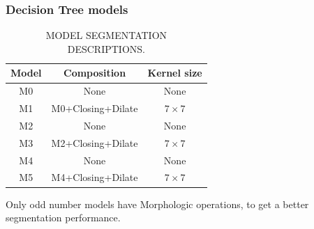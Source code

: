 \documentclass[
serif,
compress,
xcolor=table,
dvipsnames,
]{beamer}
\begin{document}
\begin{frame}
\frametitle{Decision Tree models}
\begin{table}[h]
\caption*{MODEL SEGMENTATION DESCRIPTIONS.}
\centering
    \begin{tabular}{|c|c|c|}
    \hline
    Model &  Composition & Kernel size  \\
    \hline
    M0 &  None & None\\
    \hline
    M1 &  M0+Closing+Dilate & $7\times7$ \\
        \hline
    M2 &  None & None \\
        \hline
    M3 &  M2+Closing+Dilate & $7\times7$\\
        \hline
    M4 &  None & None \\
        \hline
    M5 &  M4+Closing+Dilate & $7\times7$\\
        \hline
    
    \end{tabular}
    \label{modelsdetails}
\end{table}

Only odd number models have Morphologic operations, to get a better segmentation performance. 

\end{frame}
\end{document}
